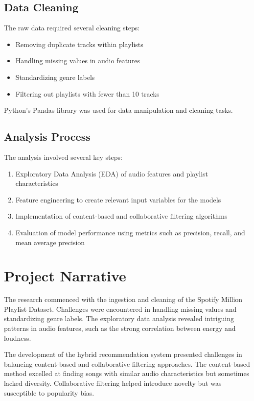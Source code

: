 \documentclass[runningheads]{llncs}
\begin{document}
\subsection{Data Cleaning}
The raw data required several cleaning steps:
\begin{itemize}
    \item Removing duplicate tracks within playlists
    \item Handling missing values in audio features
    \item Standardizing genre labels
    \item Filtering out playlists with fewer than 10 tracks
\end{itemize}

Python's Pandas library was used for data manipulation and cleaning tasks.

\subsection{Analysis Process}
The analysis involved several key steps:
\begin{enumerate}
    \item Exploratory Data Analysis (EDA) of audio features and playlist characteristics
    \item Feature engineering to create relevant input variables for the models
    \item Implementation of content-based and collaborative filtering algorithms
    \item Evaluation of model performance using metrics such as precision, recall, and mean average precision
\end{enumerate}

\section{Project Narrative}

The research commenced with the ingestion and cleaning of the Spotify Million Playlist Dataset. Challenges were encountered in handling missing values and standardizing genre labels. The exploratory data analysis revealed intriguing patterns in audio features, such as the strong correlation between energy and loudness.

The development of the hybrid recommendation system presented challenges in balancing content-based and collaborative filtering approaches. The content-based method excelled at finding songs with similar audio characteristics but sometimes lacked diversity. Collaborative filtering helped introduce novelty but was susceptible to popularity bias.
\end{document}
